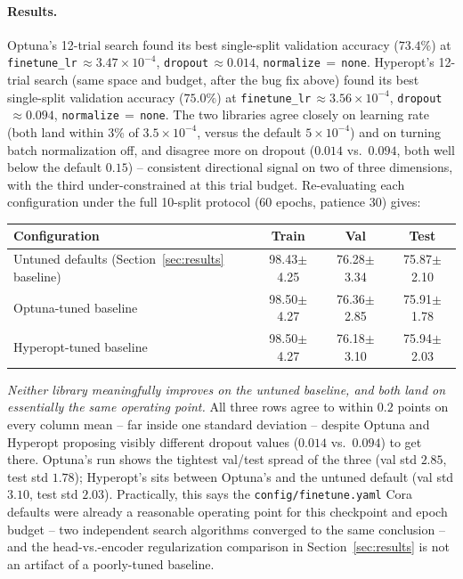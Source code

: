 \documentclass{article}
\newcommand{\score}[2]{#1{\scriptsize$\pm$#2}}
\begin{document}
\paragraph{Results.} Optuna's 12-trial search found its best single-split
validation accuracy ($73.4\%$) at \texttt{finetune\_lr}$\,\approx
3.47\times 10^{-4}$, \texttt{dropout}$\,\approx 0.014$,
\texttt{normalize}$\,=\,$\texttt{none}. Hyperopt's 12-trial search (same
space and budget, after the bug fix above) found its best single-split
validation accuracy ($75.0\%$) at \texttt{finetune\_lr}$\,\approx
3.56\times 10^{-4}$, \texttt{dropout}$\,\approx 0.094$,
\texttt{normalize}$\,=\,$\texttt{none}. The two libraries agree closely on
learning rate (both land within 3\% of $3.5\times10^{-4}$, versus the
default $5\times10^{-4}$) and on turning batch normalization off, and
disagree more on dropout ($0.014$ vs.\ $0.094$, both well below the
default $0.15$) -- consistent directional signal on two of three
dimensions, with the third under-constrained at this trial budget.
Re-evaluating each configuration under the full 10-split protocol (60
epochs, patience 30) gives:

\begin{center}
\begin{tabular}{lccc}
\toprule
Configuration & Train & Val & Test \\
\midrule
Untuned defaults (Section~\ref{sec:results} baseline) & \score{98.43}{4.25} & \score{76.28}{3.34} & \score{75.87}{2.10} \\
Optuna-tuned baseline                                  & \score{98.50}{4.27} & \score{76.36}{2.85} & \score{75.91}{1.78} \\
Hyperopt-tuned baseline                                & \score{98.50}{4.27} & \score{76.18}{3.10} & \score{75.94}{2.03} \\
\bottomrule
\end{tabular}
\end{center}

\emph{Neither library meaningfully improves on the untuned baseline, and
both land on essentially the same operating point.} All three rows agree
to within $0.2$ points on every column mean -- far inside one standard
deviation -- despite Optuna and Hyperopt proposing visibly different
dropout values ($0.014$ vs.\ $0.094$) to get there. Optuna's run shows the
tightest val/test spread of the three (val std $2.85$, test std $1.78$);
Hyperopt's sits between Optuna's and the untuned default (val std $3.10$,
test std $2.03$). Practically, this says the \texttt{config/finetune.yaml}
Cora defaults were already a reasonable operating point for this
checkpoint and epoch budget -- two independent search algorithms
converged to the same conclusion -- and the head-vs.-encoder
regularization comparison in Section~\ref{sec:results} is not an artifact
of a poorly-tuned baseline.
\end{document}

